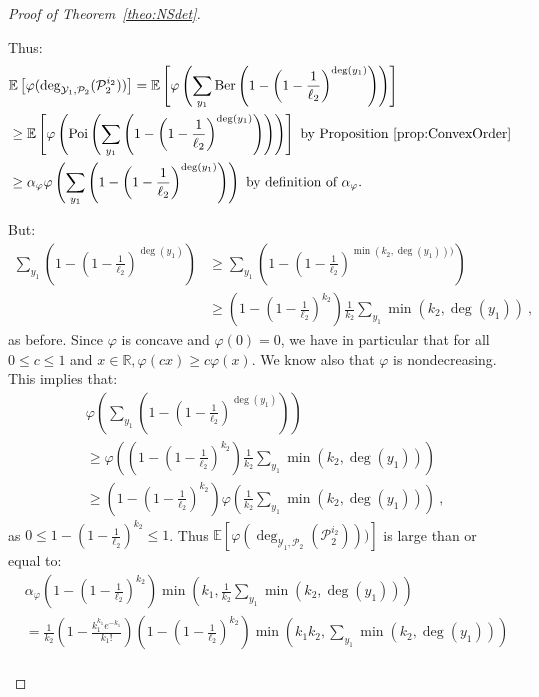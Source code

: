 \begin{proof}[Proof of Theorem~\ref{theo:NSdet}]
\begin{enumerate}
Thus:
\begin{equation}
  \begin{aligned}
    &\mathbb{E}\left[\varphi(\deg_{\mathcal{Y}_1,\mathcal{P}_2}(\mathcal{P}_2^{i_2}))\right] = \mathbb{E}\left[\varphi\left(\sum_{y_1}\operatorname{\text{Ber}}\left(1-\left(1-\frac{1}{\ell_2}\right)^{\deg(y_1)}\right)\right)\right]\\
    &\geq  \mathbb{E}\left[\varphi\left(\operatorname{\text{Poi}}\left(\sum_{y_1}\left(1-\left(1-\frac{1}{\ell_2}\right)^{\deg(y_1)}\right)\right)\right)\right] \text{ by Proposition~\ref{prop:ConvexOrder}}\\
    &\geq \alpha_{\varphi}\varphi\left(\sum_{y_1}\left(1-\left(1-\frac{1}{\ell_2}\right)^{\deg(y_1)}\right)\right) \text{ by definition of $\alpha_{\varphi}$.}
  \end{aligned}
\end{equation}

But:
\begin{equation}
  \begin{aligned}
    \sum_{y_1}\left(1-\left(1-\frac{1}{\ell_2}\right)^{\deg(y_1)}\right) &\geq \sum_{y_1}\left(1-\left(1-\frac{1}{\ell_2}\right)^{\min\left(k_2,\deg(y_1)\right))}\right)\\
    &\geq \left(1-\left(1-\frac{1}{\ell_2}\right)^{k_2}\right)\frac{1}{k_2}\sum_{y_1}\min\left(k_2,\deg(y_1)\right) \ ,
  \end{aligned}
\end{equation}
as before. Since $\varphi$ is concave and $\varphi(0)=0$, we have in particular that for all $0 \leq c \leq 1$ and $x \in \mathbb{R}, \varphi(cx)\geq c\varphi(x)$. We know also that $\varphi$ is nondecreasing. This implies that:
\begin{equation}
  \begin{aligned}
    &\varphi\left(\sum_{y_1}\left(1-\left(1-\frac{1}{\ell_2}\right)^{\deg(y_1)}\right)\right)\\
    &\geq \varphi\left(\left(1-\left(1-\frac{1}{\ell_2}\right)^{k_2}\right)\frac{1}{k_2}\sum_{y_1}\min\left(k_2,\deg(y_1)\right)\right) \\
&\geq \left(1-\left(1-\frac{1}{\ell_2}\right)^{k_2}\right)\varphi\left(\frac{1}{k_2}\sum_{y_1}\min\left(k_2,\deg(y_1)\right)\right) \ ,
  \end{aligned}
\end{equation}
as $0 \leq 1-\left(1-\frac{1}{\ell_2}\right)^{k_2} \leq 1$. Thus $\mathbb{E}\left[\varphi(\deg_{\mathcal{Y}_1,\mathcal{P}_2}(\mathcal{P}_2^{i_2})))\right]$ is large than or equal to:
\begin{equation}
  \begin{aligned}
    &\alpha_{\varphi}\left(1-\left(1-\frac{1}{\ell_2}\right)^{k_2}\right)\min\left(k_1,\frac{1}{k_2}\sum_{y_1}\min\left(k_2,\deg(y_1)\right)\right)\\
    &= \frac{1}{k_2}\left(1 - \frac{k_1^{k_1}e^{-k_1}}{k_1!}\right)\left(1-\left(1-\frac{1}{\ell_2}\right)^{k_2}\right)\min\left(k_1k_2,\sum_{y_1}\min\left(k_2,\deg(y_1)\right)\right)\\
  \end{aligned}
\end{equation}


\end{enumerate}
\end{proof}
